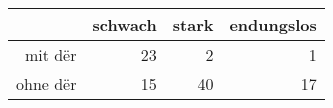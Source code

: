 \begin{tabular}{rrrr}
  \hline
 & schwach & stark & endungslos \\ 
  \hline
mit dër & 23 & 2 & 1 \\ 
  ohne dër & 15 & 40 & 17 \\ 
   \hline
\end{tabular}
